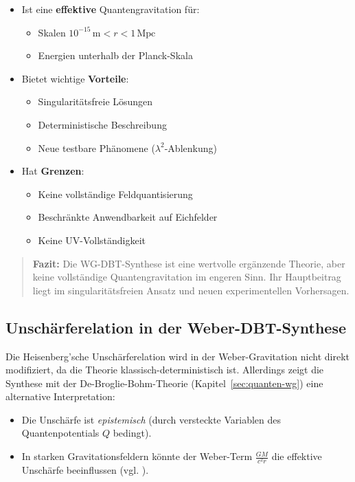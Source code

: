 \begin{itemize}
\item Ist eine \textbf{effektive} Quantengravitation für:
\begin{itemize}
\item Skalen $10^{-15}\,\text{m} < r < 1\,\text{Mpc}$
\item Energien unterhalb der Planck-Skala
\end{itemize}

\item Bietet wichtige \textbf{Vorteile}:
\begin{itemize}
\item Singularitätsfreie Lösungen
\item Deterministische Beschreibung
\item Neue testbare Phänomene ($\lambda^2$-Ablenkung)
\end{itemize}

\item Hat \textbf{Grenzen}:
\begin{itemize}
\item Keine vollständige Feldquantisierung
\item Beschränkte Anwendbarkeit auf Eichfelder
\item Keine UV-Vollständigkeit
\end{itemize}
\end{itemize}

\begin{quote}
\textbf{Fazit:} Die WG-DBT-Synthese ist eine wertvolle ergänzende Theorie, aber keine vollständige Quantengravitation im engeren Sinn. Ihr Hauptbeitrag liegt im
singularitätsfreien Ansatz und neuen experimentellen Vorhersagen.
\end{quote}

\subsection{Unschärferelation in der Weber-DBT-Synthese}
Die Heisenberg’sche Unschärferelation wird in der Weber-Gravitation nicht direkt modifiziert, da die Theorie klassisch-deterministisch ist. Allerdings zeigt die Synthese mit der
De-Broglie-Bohm-Theorie (Kapitel~\ref{sec:quanten-wg}) eine alternative Interpretation:
\begin{itemize}
    \item Die Unschärfe ist \textit{epistemisch} (durch versteckte Variablen des Quantenpotentials $Q$ bedingt).
    \item In starken Gravitationsfeldern könnte der Weber-Term $\frac{GM}{c^2 r}$ die effektive Unschärfe beeinflussen (vgl. \cite{bohm1952}).
\end{itemize}
